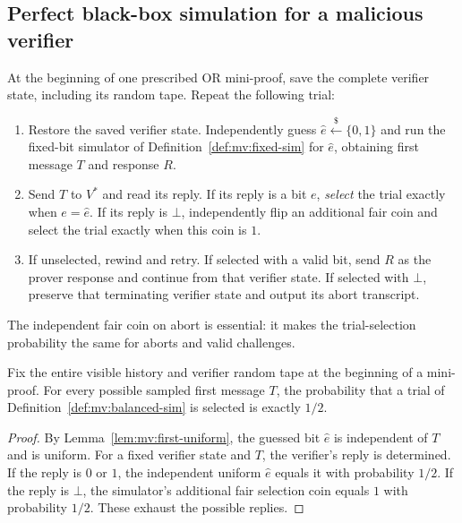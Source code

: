 \subsection{Perfect black-box simulation for a malicious verifier}\label{sec:mv:rewinding}

\begin{definition}\label{def:mv:balanced-sim}
At the beginning of one prescribed OR mini-proof,
save the complete verifier state, including its
random tape. Repeat the following trial:
\begin{enumerate}[label=\textup{(\roman*)}]
\item Restore the saved verifier state.
Independently guess $\widehat e\overset{\$}{\leftarrow}
\{0,1\}$ and run the fixed-bit simulator
of Definition~\ref{def:mv:fixed-sim} for $\widehat e$,
obtaining first message $T$ and response $R$.
\item Send $T$ to $V^*$ and read its reply.
If its reply is a bit $e$, \emph{select} the
trial exactly when $e=\widehat e$.
If its reply is $\bot$, independently
flip an additional fair coin and select
the trial exactly when this coin is $1$.
\item If unselected, rewind and retry.
If selected with a valid bit, send $R$
as the prover response and continue
from that verifier state. If selected
with $\bot$, preserve that terminating
verifier state and output its abort transcript.
\end{enumerate}
The independent fair coin on abort is essential:
it makes the trial-selection probability
the same for aborts and valid challenges.
\end{definition}

\begin{lemma}\label{lem:mv:half}
Fix the entire visible history and verifier
random tape at the beginning of a mini-proof.
For every possible sampled first message $T$,
the probability that a trial of
Definition~\ref{def:mv:balanced-sim}
is selected is exactly $1/2$.
\end{lemma}
\begin{proof}
By Lemma~\ref{lem:mv:first-uniform},
the guessed bit $\widehat e$ is independent
of $T$ and is uniform.
For a fixed verifier state and $T$,
the verifier's reply is determined.
If the reply is $0$ or $1$, the independent
uniform $\widehat e$ equals it with probability $1/2$.
If the reply is $\bot$, the simulator's
additional fair selection coin equals $1$
with probability $1/2$.
These exhaust the possible replies.
\end{proof}

